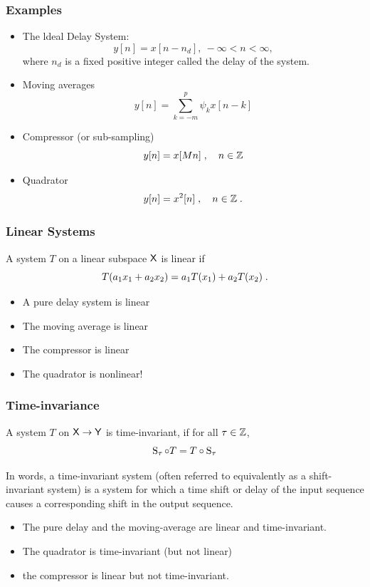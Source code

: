 \begin{frame}
\frametitle{Examples}
\begin{itemize}
\item \alert{The ldeal Delay System}: 
$$
y[n]=x[n-n_{d}],\ -\infty<n<\infty,
$$
where $n_{d}$ is a fixed positive integer called the delay of the system.
\item \alert{Moving averages} 
$$
y[n]= \sum_{k=-m}^p \psi_k x[n-k]
$$
\item \alert{Compressor} (or sub-sampling)
$$
y[n]= x[Mn] \;, \quad n \in \mathbb{Z}
$$
\item \alert{Quadrator}
$$
y[n]= x^2[n] \;, \quad n \in \mathbb{Z} \;.
$$
\end{itemize}
\end{frame}

\begin{frame}
\frametitle{Linear Systems}
\begin{definition}
A system $T$ on a linear subspace $\mathsf{X}$ is linear if
$$
T( a_1 x_{1}+a_2 x_{2})=a_1 T(x_1) + a_2 T(x_2) \;.
$$
\end{definition}
\begin{itemize}
\item A pure delay system is linear
\item The moving average is linear
\item The compressor is linear
\item The quadrator is nonlinear!
\end{itemize}
\end{frame}

\begin{frame}
\frametitle{Time-invariance}
\begin{definition}
A system $T$ on $\mathsf{X} \to \mathsf{Y}$ is \alert{time-invariant}, if for all $\tau \in \mathbb{Z}$, 
\alert{
$$
\operatorname{S}_{\tau} \circ T = T \circ \operatorname{S}_\tau 
$$
}
\end{definition}
In words, a time-invariant system (often referred to equivalently as a shift-invariant system) is a system for which a time shift or delay of the input sequence causes a corresponding shift in the output sequence.
\begin{itemize}
\item The pure delay and the moving-average are linear and time-invariant.
\item The quadrator is time-invariant (but not linear)
\item the compressor is linear but not time-invariant.
\end{itemize}
\end{frame}



